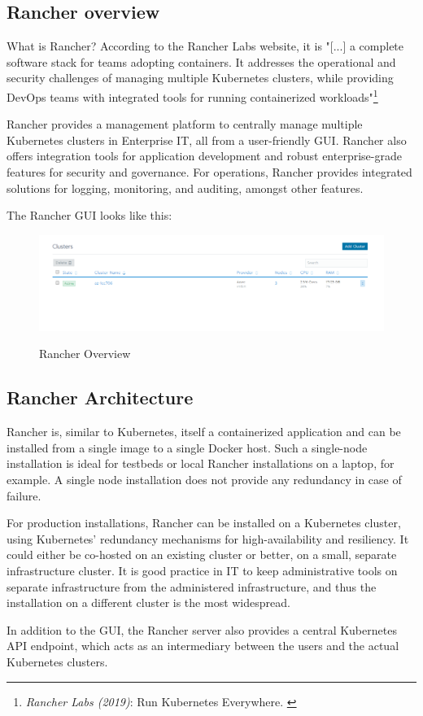 \subsection{Rancher overview}

What is Rancher? According to the Rancher Labs website, it is "[...] a complete software stack for teams adopting containers. It addresses the operational and security challenges of managing multiple Kubernetes clusters, while providing DevOps teams with integrated tools for running containerized workloads"\footnote{\textit{Rancher Labs (2019)}: Run Kubernetes Everywhere. \cite{rancher}}

Rancher provides a management platform to centrally manage multiple Kubernetes clusters in Enterprise IT, all from a user-friendly GUI. Rancher also offers integration tools for application development and robust enterprise-grade features for security and governance. For operations, Rancher provides integrated solutions for logging, monitoring, and auditing, amongst other features.

The Rancher GUI looks like this:

\begin{figure}[H]
\centering
\caption {Rancher Overview}
\includegraphics[width=\linewidth]{images/cluster-overview.png}
\label{fig:rancherOverview}
\end{figure}


\subsection{Rancher Architecture}

Rancher is, similar to Kubernetes, itself a containerized application and can be installed from a single image to a single Docker host. Such a single-node installation is ideal for testbeds or local Rancher installations on a laptop, for example. A single node installation does not provide any redundancy in case of failure.

For production installations, Rancher can be installed on a Kubernetes cluster, using Kubernetes' redundancy mechanisms for high-availability and resiliency. It could either be co-hosted on an existing cluster or better, on a small, separate infrastructure cluster. It is good practice in IT to keep administrative tools on separate infrastructure from the administered infrastructure, and thus the installation on a different cluster is the most widespread.

In addition to the GUI, the Rancher server also provides a central Kubernetes API endpoint, which acts as an intermediary between the users and the actual Kubernetes clusters.
